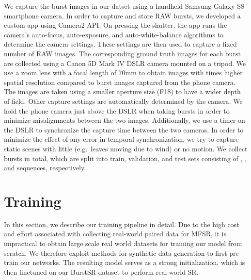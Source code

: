 We capture the burst images in our datset using a handheld Samsung Galaxy S8 smartphone camera. 
In order to capture and store RAW bursts, we developed a custom app using Camera2 API. On pressing the shutter, the app runs the camera's auto-focus, auto-exposure, and auto-white-balance algorithms to determine the camera settings. These settings are then used to capture a fixed number of RAW images. 
The corresponding ground truth images for each burst are collected using a Canon 5D Mark IV DSLR camera mounted on a tripod. We use a zoom lens with a focal length of 70mm to obtain images with  times higher spatial resolution compared to burst images captured from the phone camera. The images are taken using a smaller aperture size (F18) to have a wider depth of field. Other capture settings are automatically determined by the camera. We hold the phone camera just above the DSLR when taking bursts in order to minimize misalignments between the two images. Additionally, we use a timer on the DSLR to synchronize the capture time between the two cameras. In order to minimize the effect of any error in temporal synchronization, we try to capture static scenes with little (e.g.\ leaves moving due to wind) or no motion. 
We collect  bursts in total, which are split into train, validation, and test sets consisting of , , and  sequences, respectively.



\section{Training}
In this section, we describe our training pipeline in detail. Due to the high cost and effort associated with collecting real-world paired data for MFSR, it is impractical to obtain large scale real world datasets for training our model from scratch. 
We therefore exploit methods for synthetic data generation to first pre-train our networks. The resulting model serves as a strong initialization, which is then finetuned on our BurstSR dataset to perform real-world SR. 

